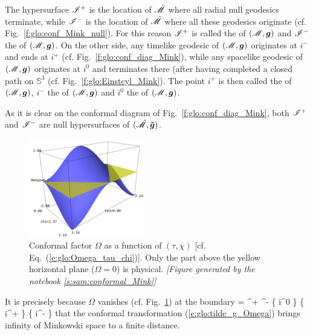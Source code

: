 The hypersurface $\mathscr{I}^+$ is the location of $\tilde{\mathscr{M}}$ where all radial null geodesics
terminate, while $\mathscr{I}^-$ is the location of $\tilde{\mathscr{M}}$ where all these geodesics originate (cf. Fig.~\ref{f:glo:conf_Mink_null}). For this
reason $\mathscr{I}^+$ is called the
of $(\mathscr{M},\bm{g})$
and $\mathscr{I}^-$ the 
of $(\mathscr{M},\bm{g})$.
On the other side, any timelike geodesic of $(\mathscr{M},\bm{g})$ originates at $i^-$ and ends at
$i^+$ (cf. Fig.~\ref{f:glo:conf_diag_Mink}), while any spacelike geodesic
of $(\mathscr{M},\bm{g})$ originates at $i^0$ and terminates there
(after having completed a closed path on $\mathbb{S}^3$ (cf. Fig.~\ref{f:glo:Einstcyl_Mink}).
The point $i^+$ is then called the
of $(\mathscr{M},\bm{g})$,
$i^-$ the 
of $(\mathscr{M},\bm{g})$
and $i^0$ the  of $(\mathscr{M},\bm{g})$.

As it is clear on the conformal diagram of Fig.~\ref{f:glo:conf_diag_Mink},
both $\mathscr{I}^+$ and $\mathscr{I}^-$ are null hypersurfaces of $(\tilde{\mathscr{M}},\bm{\tilde{g}})$.

\begin{figure}
\centerline{\includegraphics[width=0.45\textwidth]{glo_Omega_Mink.jpg}}
\caption[]{\label{f:glo:Omega_Mink}\footnotesize
Conformal factor $\Omega$ as a function of $(\tau,\chi)$ [cf. Eq.~(\ref{e:glo:Omega_tau_chi})].
Only the part above the yellow horizontal plane ($\Omega=0$) is physical.
\textsl{[Figure generated by the notebook \ref{s:sam:conformal_Mink}]}
}
\end{figure}


It is precisely because $\Omega$ vanishes (cf. Fig.~\ref{f:glo:Omega_Mink}) at the boundary
\be
    \overline{\M} \setminus \M = \scri^+ \cup \scri^- \cup \left\{ i^0 \right\} \cup
            \left\{ i^+ \right\} \cup \left\{ i^- \right\}
\ee
that the conformal transformation (\ref{e:glo:tilde_g_Omega}) brings infinity
of Minkowski space to a finite distance.


